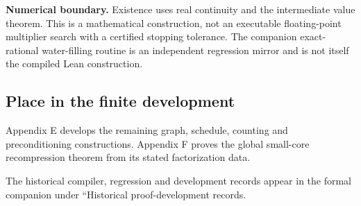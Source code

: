 \textbf{Numerical boundary.} Existence uses real continuity and the intermediate value theorem. This is a mathematical construction, not an executable floating-point multiplier search with a certified stopping tolerance. The companion exact-rational water-filling routine is an independent regression mirror and is not itself the compiled Lean construction.



\subsection{Place in the finite development}\label{supp4:subsection:007}
Appendix E develops the remaining graph, schedule, counting and preconditioning constructions. Appendix F proves the global small-core recompression theorem from its stated factorization data.

The historical compiler, regression and development records appear in the formal companion under ``Historical proof-development records.
